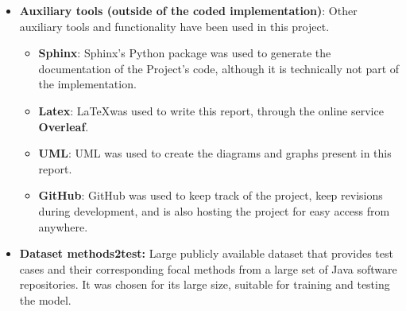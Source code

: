 \documentclass[a4paper, 11pt]{report}
\begin{document}
\begin{itemize}
    \item \textbf{Auxiliary tools (outside of the coded implementation)}: Other auxiliary tools and functionality have been used in this project.
    \begin{itemize}
        \item \textbf{Sphinx}: Sphinx's Python package was used to generate the documentation of the Project's code, although it is technically not part of the implementation.
        \item \textbf{Latex}: \LaTeX was used to write this report, through the online service \textbf{Overleaf}.
        \item \textbf{UML}: UML was used to create the diagrams and graphs present in this report.
        \item \textbf{GitHub}: GitHub was used to keep track of the project, keep revisions during development, and is also hosting the project for easy access from anywhere.
    \end{itemize}

    \item \textbf{Dataset methods2test:} Large publicly available dataset that provides test cases and their corresponding focal methods from a large set of Java software repositories. It was chosen for its large size, suitable for training and testing the model\cite{tufano2021unit}.
    \end{itemize}
\end{document}
